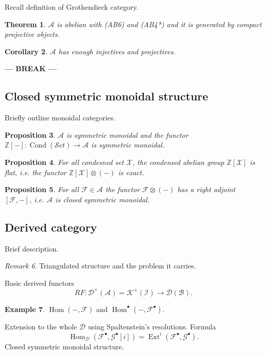 \documentclass[11pt,A4]{article}
\theoremstyle{plain}
\newtheorem{thm}{Theorem}[section]
\newtheorem{prop}[thm]{Proposition}
\newtheorem{cor}[thm]{Corollary}
\theoremstyle{definition}
\newtheorem{exa}[thm]{Example}
\theoremstyle{remark}
\newtheorem{rem}[thm]{Remark}
\newcommand{\Z}{\mathbb{Z}}
\newcommand{\1}{\mathbbm{1}}
\newcommand{\A}{\mathscr{A}}
\newcommand{\Set}{\mathscr{S}et}
\newcommand{\D}{\mathscr{D}}
\newcommand{\K}{\mathscr{K}}
\newcommand{\F}{\mathcal{F}}
\newcommand{\G}{\mathcal{G}}
\newcommand{\X}{\mathcal{X}}
\DeclareMathOperator{\Hom}{Hom}
\DeclareMathOperator{\Ext}{Ext}
\DeclareMathOperator{\Cond}{Cond}
\newcommand{\ot}{\otimes}
\newcommand{\grd}{^{\bullet}}
\begin{document}
Recall definition of Grothendieck category.

\begin{thm}
    $\A$ is abelian with (AB6) and (AB4*) and it is generated by compact projective objects.
\end{thm}

\begin{cor}
    $\A$ has enough injectives and projectives.
\end{cor}

\begin{center}
    \textbf{--- BREAK ---}
\end{center}

\subsection{Closed symmetric monoidal structure}

Briefly outline monoidal categories.

\begin{prop}
    $\A$ is symmetric monoidal and the functor $\Z[-]\colon \Cond(\Set)\to \A$ is symmetric monoidal.
\end{prop}

\begin{prop}
    For all condesned set $\X$, the condensed abelian group $\Z[\X]$ is flat, i.e. the functor $\Z[\X]\ot (-)$ is exact.
\end{prop}

\begin{prop}
    For all $\F\in\A$ the functor $\F\ot(-)$ has a right adjoint $[\F,-]$, i.e. $\A$ is closed symmetric monoidal.
\end{prop}

\subsection{Derived category}

Brief description.

\begin{rem}
    Triangulated structure and the problem it carries.
\end{rem}

Basic derived functors
\[ RF\colon \D^{+}(\A)=\K^{+}(\mathcal{I})\to \D(\mathscr{B}). \]

\begin{exa}
    $\Hom(-,\F)$ and $\Hom\grd(-,\F\grd)$.
\end{exa}

Extension to the whole $\D$ using Spaltenstein's resolutions.
Formula
\[ \Hom_{\D}(\F\grd,\G\grd[i])=\Ext^{i}(\F\grd,\G\grd).\]
Closed symmetric monoidal structure.
\end{document}
